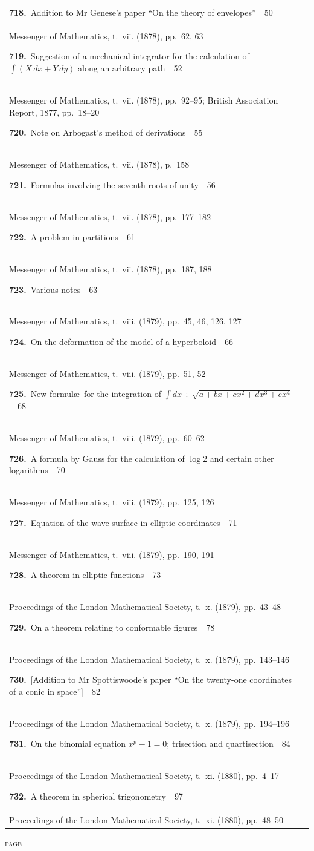\documentclass[11pt,a4paper]{book}
\newcommand{\paperentry}[4]{%
  \noindent\textbf{#1.}\ {#2}\ \dotfill\ {#3}\\[-0.2em]%
  {\small #4}\par\vspace{0.6em}%
}
\begin{document}
\begin{center}
\begin{tabular}{p{4.2in}r}
\paperentry{718}{Addition to Mr Genese's paper ``On the theory of envelopes''}{50}{Messenger of Mathematics, t.~vii. (1878), pp.~62, 63}
\paperentry{719}{Suggestion of a mechanical integrator for the calculation of $\int(X\,dx + Y\,dy)$ along an arbitrary path}{52}{Messenger of Mathematics, t.~vii. (1878), pp.~92--95; British Association Report, 1877, pp.~18--20}
\paperentry{720}{Note on Arbogast's method of derivations}{55}{Messenger of Mathematics, t.~vii. (1878), p.~158}
\paperentry{721}{Formulas involving the seventh roots of unity}{56}{Messenger of Mathematics, t.~vii. (1878), pp.~177--182}
\paperentry{722}{A problem in partitions}{61}{Messenger of Mathematics, t.~vii. (1878), pp.~187, 188}
\paperentry{723}{Various notes}{63}{Messenger of Mathematics, t.~viii. (1879), pp.~45, 46, 126, 127}
\paperentry{724}{On the deformation of the model of a hyperboloid}{66}{Messenger of Mathematics, t.~viii. (1879), pp.~51, 52}
\paperentry{725}{New formul\ae\ for the integration of $\int dx \div \sqrt{a + bx + cx^{2} + dx^{3} + ex^{4}}$}{68}{Messenger of Mathematics, t.~viii. (1879), pp.~60--62}
\paperentry{726}{A formula by Gauss for the calculation of $\log 2$ and certain other logarithms}{70}{Messenger of Mathematics, t.~viii. (1879), pp.~125, 126}
\paperentry{727}{Equation of the wave-surface in elliptic coordinates}{71}{Messenger of Mathematics, t.~viii. (1879), pp.~190, 191}
\paperentry{728}{A theorem in elliptic functions}{73}{Proceedings of the London Mathematical Society, t.~x. (1879), pp.~43--48}
\paperentry{729}{On a theorem relating to conformable figures}{78}{Proceedings of the London Mathematical Society, t.~x. (1879), pp.~143--146}
\paperentry{730}{[Addition to Mr Spottiswoode's paper ``On the twenty-one coordinates of a conic in space'']}{82}{Proceedings of the London Mathematical Society, t.~x. (1879), pp.~194--196}
\paperentry{731}{On the binomial equation $x^{p} - 1 = 0$; trisection and quartisection}{84}{Proceedings of the London Mathematical Society, t.~xi. (1880), pp.~4--17}
\paperentry{732}{A theorem in spherical trigonometry}{97}{Proceedings of the London Mathematical Society, t.~xi. (1880), pp.~48--50}
\end{tabular}
\end{center}

\newpage
\thispagestyle{fancy}
\begin{center}
{\small\textsc{page}}
\end{center}
\vspace{-0.5em}
\end{document}
